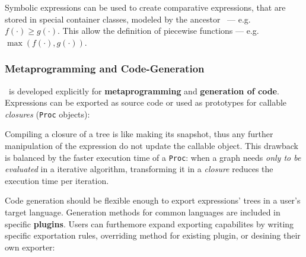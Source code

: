 \noindent%



Symbolic expressions can be used to create comparative expressions, that are stored in special container classes, modeled by the ancestor \CASExpression~--- e.g. $f(\cdot) \geq g(\cdot)$. This allow the definition of piecewise functions --- e.g. $\max(f(\cdot), g(\cdot))$.

\noindent%


\subsubsection{Metaprogramming and Code-Generation}

\ragnicas~is developed explicitly for \textbf{meta\-programming} and \textbf{generation of code}. Expressions can be exported as source code or used as prototypes for callable \emph{closures} (\texttt{Proc} objects):

\noindent%


Compiling a closure of a tree is like making its snapshot, thus any further manipulation of the expression do not update the callable object. This drawback is balanced by the faster execution time of a \texttt{Proc}: when a graph needs \emph{only to be evaluated} in a iterative algorithm, transforming it in a \emph{closure} reduces the execution time per iteration.

Code generation should be flexible enough to export expressions' trees in a user's target language. Generation methods for common languages are included in specific \textbf{plugins}. Users can furthemore expand exporting capabilites by writing specific exportation rules,  overriding method for existing plugin, or desining their own exporter:

\noindent%

